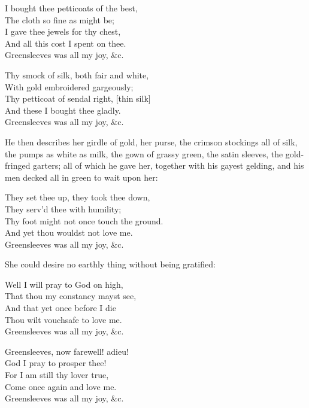 \settowidth{\versewidth}{I bought thee petticoats of the best,}
\begin{dcverse}\begin{patverse}
I bought thee petticoats of the best,\\
The cloth so fine as might be;\\
I gave thee jewels for thy chest,\\
And all this cost I spent on thee.\\
Greensleeves was all my joy, \&c.
\end{patverse}

\begin{patverse}
Thy smock of silk, both fair and white,\\
With gold embroidered gargeously;\\
Thy petticoat of sendal right, [thin silk]\\
And these I bought thee gladly.\\
Greensleeves was all my joy, \&c.
\end{patverse}
\end{dcverse}
\noindent He then describes her girdle of gold, her purse, the crimson stockings all of silk,
the pumps as white as milk, the gown of grassy green, the satin sleeves, the
gold-fringed garters; all of which he gave her, together with his gayest gelding,
and his men decked all in green to wait upon her:
\settowidth{\versewidth}{Thy foot might not once touch the ground.}
\begin{scverse}\begin{patverse}
They set thee up, they took thee down,\\
They serv’d thee with humility;\\
Thy foot might not once touch the ground.\\
And yet thou wouldst not love me.\\
Greensleeves was all my joy, \&c.
\end{patverse}
\end{scverse}
She could desire no earthly thing without being gratified:

\begin{dcverse}\begin{patverse}
Well I will pray to God on high,\\
That thou my constancy mayst see,\\
And that yet once before I die\\
Thou wilt vouchsafe to love me.\\
Greensleeves was all my joy, \&c.
\end{patverse}

\begin{patverse}
Greensleeves, now farewell! adieu!\\
God I pray to prosper thee!\\
For I am still thy lover true,\\
Come once again and love me.\\
Greensleeves was all my joy, \&c.
\end{patverse}
\end{dcverse}


